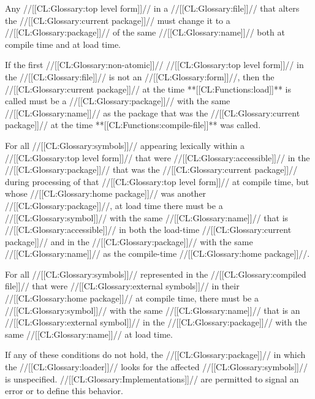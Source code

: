 \beginlist

 Any //[[CL:Glossary:top level form]]// in a //[[CL:Glossary:file]]// that alters
	  the //[[CL:Glossary:current package]]// must change it to a //[[CL:Glossary:package]]//
	  of the same //[[CL:Glossary:name]]// both at compile time and at load time.

 If the first //[[CL:Glossary:non-atomic]]// //[[CL:Glossary:top level form]]// in the //[[CL:Glossary:file]]//
	  is not an  //[[CL:Glossary:form]]//, then the //[[CL:Glossary:current package]]//
	  at the time **[[CL:Functions:load]]** is called must be a //[[CL:Glossary:package]]// with the 
	  same //[[CL:Glossary:name]]// as the package that was the //[[CL:Glossary:current package]]//
	  at the time **[[CL:Functions:compile-file]]** was called.
\endlist

 For all //[[CL:Glossary:symbols]]// 
      appearing lexically within a //[[CL:Glossary:top level form]]// that
      were //[[CL:Glossary:accessible]]// in the //[[CL:Glossary:package]]// that was the //[[CL:Glossary:current package]]//
      during processing of that //[[CL:Glossary:top level form]]// at compile time, but
      whose //[[CL:Glossary:home package]]// was another //[[CL:Glossary:package]]//, at load time there must
      be a //[[CL:Glossary:symbol]]// with the same //[[CL:Glossary:name]]// that is //[[CL:Glossary:accessible]]// in both the
      load-time //[[CL:Glossary:current package]]// and in the //[[CL:Glossary:package]]//
      with the same //[[CL:Glossary:name]]// as the
      compile-time //[[CL:Glossary:home package]]//. 
  
 For all //[[CL:Glossary:symbols]]// represented in the //[[CL:Glossary:compiled file]]// 
      that were //[[CL:Glossary:external symbols]]// in
      their //[[CL:Glossary:home package]]// at compile time, there must be a //[[CL:Glossary:symbol]]// with the
      same //[[CL:Glossary:name]]// that is an //[[CL:Glossary:external symbol]]// in the //[[CL:Glossary:package]]// 
      with the same //[[CL:Glossary:name]]// at load time.
\endlist
        
  If any of these conditions do not hold, the //[[CL:Glossary:package]]// in which the //[[CL:Glossary:loader]]// looks
  for the affected //[[CL:Glossary:symbols]]// is unspecified.  //[[CL:Glossary:Implementations]]// are permitted 
  to signal an error or to define this behavior.


\endlist

\endsubsubsection%

